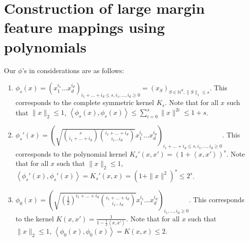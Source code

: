 \documentclass{article}
\newcommand{\field}[1]{\mathbb{#1}}
\newcommand{\fN}{\field{N}}
\newcommand{\inner}[1]{ \left\langle {#1} \right\rangle }
\begin{document}
\section{Construction of large margin feature mappings using polynomials}
Our $\phi$'s in considerations are as follows:
\begin{enumerate}
\item $\phi_{s}(x) = ( x_1^{i_1} \ldots x_d^{i_d})_{i_1 + \ldots + i_d \leq s, i_1, \ldots, i_d \geq 0} = (x_S)_{S \in \fN^d, \|S\|_1 \leq s}$. This corresponds to the complete symmetric kernel $K_s$. Note that for all $x$ such that $\| x \|_2 \leq 1$,
$\inner{\phi_{s}(x), \phi_{s}(x)} \leq \sum_{i=0}^s \|x\|^{2i} \leq 1 + s$.

\item $\phi_{s}'(x) = ( \sqrt{ {s \choose i_1+\ldots+i_d} {i_1+\ldots+i_d \choose i_1 \ldots i_d}}  x_1^{i_1} \ldots x_d^{i_d})_{i_1 + \ldots + i_d \leq s, i_1, \ldots, i_d \geq 0}$. This corresponds to the polynomial kernel
$K_s'(x,x') = (1 + \inner{x, x'})^s$. Note that for all $x$ such that $\| x \|_2 \leq 1$,
$\inner{\phi_s'(x), \phi_s'(x)} = K_s'(x,x) = (1 + \|x\|^2)^s \leq 2^s$.

\item $\phi_0(x) = ( \sqrt{ (\frac 1 2)^{i_1+\ldots+i_d} {i_1+\ldots+i_d \choose i_1 \ldots i_d}}  x_1^{i_1} \ldots x_d^{i_d})_{i_1, \ldots, i_d \geq 0}$. This corresponds to the kernel $K(x,x') = \frac{1}{1 - \frac 1 2 \inner{x,x'}}$.
Note that for all $x$ such that $\| x \|_2 \leq 1$,
$\inner{\phi_0(x), \phi_0(x)} = K(x,x) \leq 2$.
\end{enumerate}
\end{document}
